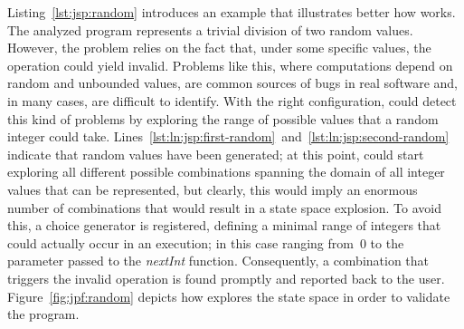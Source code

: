 Listing~\ref{lst:jsp:random} introduces an example that illustrates better how \jpf{} works. The analyzed program represents a trivial division of two random values. However, the problem relies on the fact that, under some specific values, the operation could yield invalid. Problems like this, where computations depend on random and unbounded values, are common sources of bugs in real software and, in many cases, are difficult to identify. With the right configuration, \jpf{} could detect this kind of problems by exploring the range of possible values that a random integer could take. Lines~\ref{lst:ln:jsp:first-random}~and~\ref{lst:ln:jsp:second-random} indicate that random values have been generated; at this point, \jpf{} could start exploring all different possible combinations spanning the domain of all integer values that can be represented, but clearly, this would imply an enormous number of combinations that would result in a state space explosion. To avoid this, a choice generator is registered, defining a minimal range of integers that could actually occur in an execution; in this case ranging from~0 to the parameter passed to the \textit{nextInt} function. Consequently, a combination that triggers the invalid operation is found promptly and reported back to the user. Figure~\ref{fig:jpf:random} depicts how \jpf{} explores the state space in order to validate the program.

